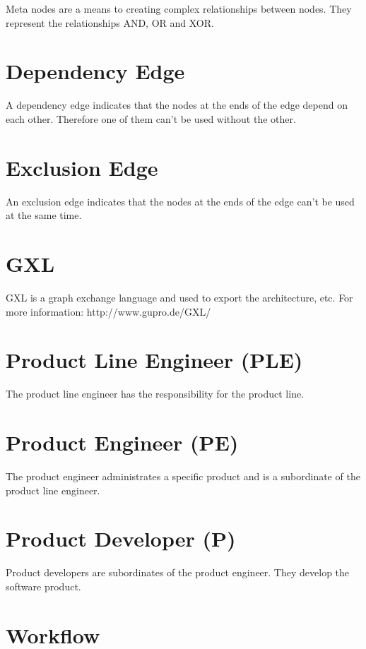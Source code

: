 Meta nodes are a means to creating complex relationships between nodes. They represent
the relationships AND, OR and XOR.

\section{Dependency Edge}

A dependency edge indicates that the nodes at the ends of the edge depend on each other.
Therefore one of them can't be used without the other.

\section{Exclusion Edge}

An exclusion edge indicates that the nodes at the ends of the edge can't be used
at the same time.

\section{GXL}

GXL is a graph exchange language and used to export the architecture, etc. For more
information: http://www.gupro.de/GXL/

\section{Product Line Engineer (PLE)}

The product line engineer has the responsibility for the product line.

\section{Product Engineer (PE)}

The product engineer administrates a specific product and is a subordinate of the
product line engineer.

\section{Product Developer (P)}

Product developers are subordinates of the product engineer. They develop the software 
product.

\section{Workflow}

